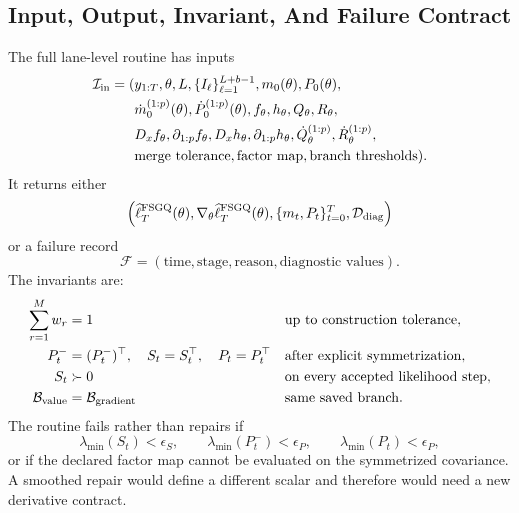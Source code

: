 \subsection{Input, Output, Invariant, And Failure Contract}
\label{sec:bf-hd-sgqf-io-contract}

The full lane-level routine has inputs
\begin{equation}
\begin{aligned}
  \mathcal I_{\rm in}=
  (&y_{1:T},\theta,L,\{I_\ell\}_{\ell=1}^{L+b-1},
  m_0(\theta),P_0(\theta),\\
  &\dot m_0^{(1:p)}(\theta),\dot P_0^{(1:p)}(\theta),
  f_\theta,h_\theta,Q_\theta,R_\theta,\\
  &D_xf_\theta,\partial_{1:p}f_\theta,
  D_xh_\theta,\partial_{1:p}h_\theta,
  \dot Q_\theta^{(1:p)},\dot R_\theta^{(1:p)},\\
  &\text{merge tolerance},\text{factor map},\text{branch thresholds}).
\end{aligned}
  \label{eq:bf-hd-sgqf-input-contract}
\end{equation}
It returns either
\begin{equation}
  \left(
  \widehat\ell_T^{\rm FSGQ}(\theta),
  \nabla_\theta\widehat\ell_T^{\rm FSGQ}(\theta),
  \{m_t,P_t\}_{t=0}^T,
  \mathcal D_{\rm diag}
  \right)
  \label{eq:bf-hd-sgqf-output-success}
\end{equation}
or a failure record
\begin{equation}
  \mathcal F=(\text{time},\text{stage},\text{reason},\text{diagnostic values}).
  \label{eq:bf-hd-sgqf-output-failure}
\end{equation}
The invariants are:
\begin{align}
  \sum_{r=1}^M w_r&=1
  &&\text{up to construction tolerance},
  \label{eq:bf-hd-sgqf-invariant-weight-sum}\\
  P_t^-&=(P_t^-)^\top,\quad
  S_t=S_t^\top,\quad
  P_t=P_t^\top
  &&\text{after explicit symmetrization},
  \label{eq:bf-hd-sgqf-invariant-symmetry}\\
  S_t&\succ0
  &&\text{on every accepted likelihood step},
  \label{eq:bf-hd-sgqf-invariant-positive-S}\\
  \mathcal B_{\rm value}&=\mathcal B_{\rm gradient}
  &&\text{same saved branch}.
  \label{eq:bf-hd-sgqf-invariant-same-branch}
\end{align}
The routine fails rather than repairs if
\begin{equation}
  \lambda_{\min}(S_t)<\epsilon_S,\qquad
  \lambda_{\min}(P_t^-)<\epsilon_P,\qquad
  \lambda_{\min}(P_t)<\epsilon_P,
  \label{eq:bf-hd-sgqf-failure-eigen}
\end{equation}
or if the declared factor map cannot be evaluated on the symmetrized covariance.
A smoothed repair would define a different scalar and therefore would need a new
derivative contract.


